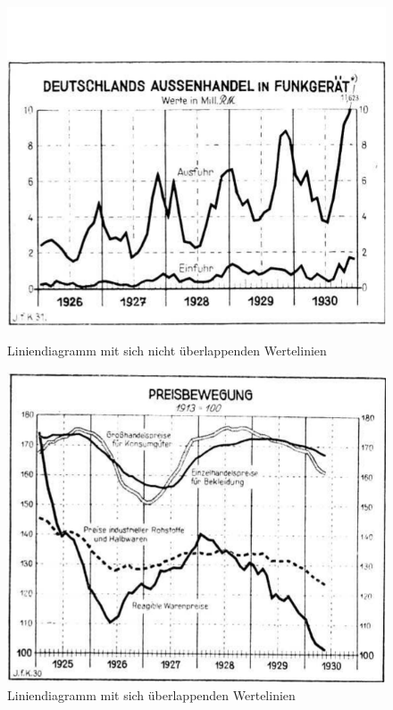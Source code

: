 \begin{figure}[H]
    \vspace{0.75em}

    \begin{minipage}{0.475\textwidth} %
        \centering
        \includegraphics[width=\linewidth]{Methodik/img/linebank_non_overlapping.png}
        \caption{ Liniendiagramm mit sich nicht überlappenden Wertelinien}
        \label{fig:linebank_non_overlapping}
    \end{minipage}\hfill %
    \begin{minipage}{0.475\textwidth} %
        \centering
        \includegraphics[width=\linewidth]{Methodik/img/linebank_overlapping.png}
        \caption{ Liniendiagramm mit sich überlappenden Wertelinien}
        \label{fig:linebank_overlapping}
    \end{minipage}
\end{figure}

